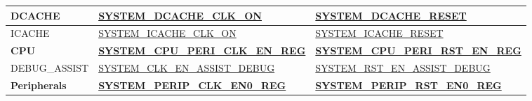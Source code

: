 \documentclass[main\_\_EN.tex]{subfiles}
\begin{document}
\begin{ThreePartTable}
\begin{longtable}[c]{ |l|l|l| }
    DCACHE & \hyperref[fielddesc:SYSTEMDCACHECLKON]{SYSTEM\_DCACHE\_CLK\_ON} & \hyperref[fielddesc:SYSTEMDCACHERESET]{SYSTEM\_DCACHE\_RESET} \\\hline
    ICACHE & \hyperref[fielddesc:SYSTEMICACHECLKON]{SYSTEM\_ICACHE\_CLK\_ON} & \hyperref[fielddesc:SYSTEMICACHERESET]{SYSTEM\_ICACHE\_RESET} \\\hline



    \textbf{CPU} & \textbf{\hyperref[regdesc:SYSTEMCPUPERICLKENREG]{SYSTEM\_CPU\_PERI\_CLK\_EN\_REG}} & \textbf{\hyperref[regdesc:SYSTEMCPUPERIRSTENREG]{SYSTEM\_CPU\_PERI\_RST\_EN\_REG}} \\ \hline
    DEBUG\_ASSIST & \hyperref[fielddesc:SYSTEMCLKENASSISTDEBUG]{SYSTEM\_CLK\_EN\_ASSIST\_DEBUG} & \hyperref[fielddesc:SYSTEMRSTENASSISTDEBUG]{SYSTEM\_RST\_EN\_ASSIST\_DEBUG} \\\hline


    \textbf{Peripherals} & \textbf{\hyperref[regdesc:SYSTEMPERIPCLKEN0REG]{SYSTEM\_PERIP\_CLK\_EN0\_REG}} &  \textbf{\hyperref[regdesc:SYSTEMPERIPRSTEN0REG]{SYSTEM\_PERIP\_RST\_EN0\_REG}} \\ \hline


\end{longtable}
\end{ThreePartTable}
\end{document}
